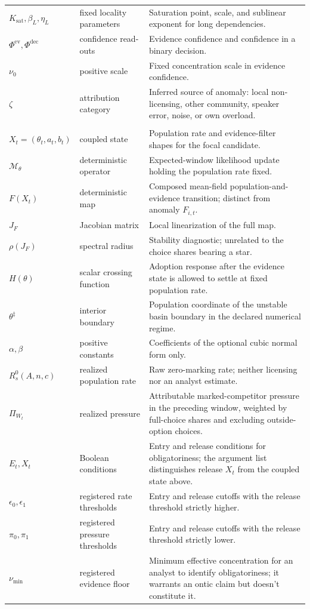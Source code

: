 \begin{longtable}{@{}>{\raggedright\arraybackslash}p{}
  >{\raggedright\arraybackslash}p{}
  >{\raggedright\arraybackslash}p{}@{}}
$K_{\mathrm{sat}},\beta_L,\eta_L$ & fixed locality parameters & Saturation point, scale, and sublinear exponent for long dependencies. \\
$\Phi^{\mathrm{ev}},\Phi^{\mathrm{dec}}$ & confidence read-outs & Evidence confidence and confidence in a binary decision. \\
$\nu_0$ & positive scale & Fixed concentration scale in evidence confidence. \\
$\zeta$ & attribution category & Inferred source of anomaly: local non-licensing, other community, speaker error, noise, or own overload. \\

\multicolumn{3}{@{}l}{\textsc{Population dynamics and obligatoriness}}\\[2pt]
$X_t=(\theta_t,a_t,b_t)$ & coupled state & Population rate and evidence-filter shapes for the focal candidate. \\
$\mathcal M_\theta$ & deterministic operator & Expected-window likelihood update holding the population rate fixed. \\
$F(X_t)$ & deterministic map & Composed mean-field population-and-evidence transition; distinct from anomaly $F_{i,t}$. \\
$J_F$ & Jacobian matrix & Local linearization of the full map. \\
$\rho(J_F)$ & spectral radius & Stability diagnostic; unrelated to the choice shares bearing a star. \\
$H(\theta)$ & scalar crossing function & Adoption response after the evidence state is allowed to settle at fixed population rate. \\
$\theta^\ddagger$ & interior boundary & Population coordinate of the unstable basin boundary in the declared numerical regime. \\
$\alpha,\beta$ & positive constants & Coefficients of the optional cubic normal form only. \\
$R_s^0(A,n,c)$ & realized population rate & Raw zero-marking rate; neither licensing nor an analyst estimate. \\
$\Pi_{W_t}$ & realized pressure & Attributable marked-competitor pressure in the preceding window, weighted by full-choice shares and excluding outside-option choices. \\
$E_t,X_t$ & Boolean conditions & Entry and release conditions for obligatoriness; the argument list distinguishes release $X_t$ from the coupled state above. \\
$\epsilon_0,\epsilon_1$ & registered rate thresholds & Entry and release cutoffs with the release threshold strictly higher. \\
$\pi_0,\pi_1$ & registered pressure thresholds & Entry and release cutoffs with the release threshold strictly lower. \\
$\nu_{\min}$ & registered evidence floor & Minimum effective concentration for an analyst to identify obligatoriness; it warrants an ontic claim but doesn't constitute it. \\
\end{longtable}
\normalsize

